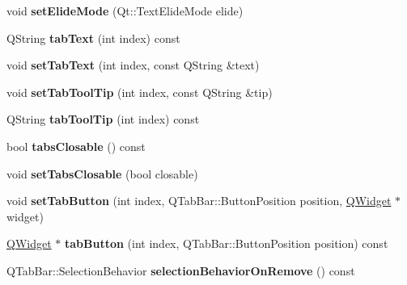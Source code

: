 \begin{DoxyCompactItemize}
\item 
\hypertarget{class_combo_tab_bar_a5756d7f84f613b550078861753512ee5}{
void {\bfseries setElideMode} (Qt::TextElideMode elide)}
\label{class_combo_tab_bar_a5756d7f84f613b550078861753512ee5}

\item 
\hypertarget{class_combo_tab_bar_a1f8455c764f3547adf12e8c5106527dd}{
QString {\bfseries tabText} (int index) const }
\label{class_combo_tab_bar_a1f8455c764f3547adf12e8c5106527dd}

\item 
\hypertarget{class_combo_tab_bar_ab23be3e427bcecdd42cb2a3d3cd892bd}{
void {\bfseries setTabText} (int index, const QString \&text)}
\label{class_combo_tab_bar_ab23be3e427bcecdd42cb2a3d3cd892bd}

\item 
\hypertarget{class_combo_tab_bar_a99b60793e4feb4358c7993dddd07333f}{
void {\bfseries setTabToolTip} (int index, const QString \&tip)}
\label{class_combo_tab_bar_a99b60793e4feb4358c7993dddd07333f}

\item 
\hypertarget{class_combo_tab_bar_a1070e2666aa5bed589ef3640ae7a2b78}{
QString {\bfseries tabToolTip} (int index) const }
\label{class_combo_tab_bar_a1070e2666aa5bed589ef3640ae7a2b78}

\item 
\hypertarget{class_combo_tab_bar_aab097d0b41ae4915544eaead6e3d87fc}{
bool {\bfseries tabsClosable} () const }
\label{class_combo_tab_bar_aab097d0b41ae4915544eaead6e3d87fc}

\item 
\hypertarget{class_combo_tab_bar_ac4178c65419140ea5cef414d86167157}{
void {\bfseries setTabsClosable} (bool closable)}
\label{class_combo_tab_bar_ac4178c65419140ea5cef414d86167157}

\item 
\hypertarget{class_combo_tab_bar_a7859982ef655a22efb3d694437d20cd3}{
void {\bfseries setTabButton} (int index, QTabBar::ButtonPosition position, \hyperlink{class_q_widget}{QWidget} $\ast$widget)}
\label{class_combo_tab_bar_a7859982ef655a22efb3d694437d20cd3}

\item 
\hypertarget{class_combo_tab_bar_ad5f5c72528c099547dcd4d76883cac34}{
\hyperlink{class_q_widget}{QWidget} $\ast$ {\bfseries tabButton} (int index, QTabBar::ButtonPosition position) const }
\label{class_combo_tab_bar_ad5f5c72528c099547dcd4d76883cac34}

\item 
\hypertarget{class_combo_tab_bar_a12be78eb2cccb159886662948729f40b}{
QTabBar::SelectionBehavior {\bfseries selectionBehaviorOnRemove} () const }
\label{class_combo_tab_bar_a12be78eb2cccb159886662948729f40b}


\end{DoxyCompactItemize}
